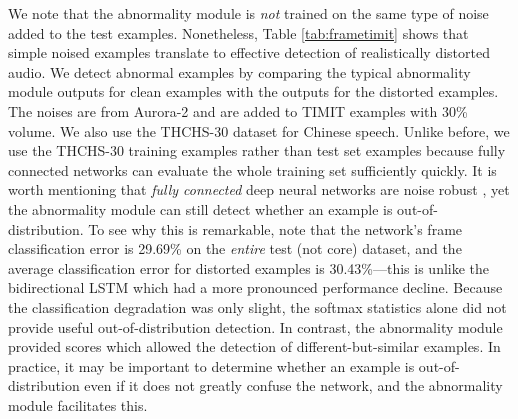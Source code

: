 \documentclass{article}
\begin{document}
We note that the abnormality module is \emph{not} trained on the same type of noise added to the test examples. Nonetheless, Table \ref{tab:frametimit} shows that simple noised examples translate to effective detection of realistically distorted audio. We detect abnormal examples by comparing the typical abnormality module outputs for clean examples with the outputs for the distorted examples. The noises are from Aurora-2 and are added to TIMIT examples with 30\% volume. We also use the THCHS-30 dataset for Chinese speech. Unlike before, we use the THCHS-30 training examples rather than test set examples because fully connected networks can evaluate the whole training set sufficiently quickly. It is worth mentioning that \emph{fully connected} deep neural networks are noise robust \citep{seltzer}, yet the abnormality module can still detect whether an example is out-of-distribution. To see why this is remarkable, note that the network's frame classification error is 29.69\% on the \emph{entire} test (not core) dataset, and the average classification error for distorted examples is 30.43\%---this is unlike the bidirectional LSTM which had a more pronounced performance decline. Because the classification degradation was only slight, the softmax statistics alone did not provide useful out-of-distribution detection. In contrast, the abnormality module provided scores which allowed the detection of different-but-similar examples. In practice, it may be important to determine whether an example is out-of-distribution even if it does not greatly confuse the network, and the abnormality module facilitates this.
\end{document}
